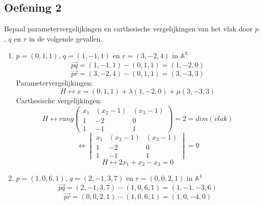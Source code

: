 \documentclass[main.tex]{subfiles}
\begin{document}
\subsection*{Oefening 2}
Bepaal parametervergelijkingen en carthesische vergelijkingen van het vlak door $p$, $q$ en $r$ in de volgende gevallen.
\begin{enumerate}
\item $p=(0,1,1)$, $q=(1,-1,1)$ en $r=(3,-2,4)$ in $\mathbb{A}^{3}$\\
  \[ \overrightarrow{pq} = (1,-1,1) - (0,1,1) = (1,-2,0) \]
  \[ \overrightarrow{pr} = (3,-2,4) - (0,1,1) = (3,-3,3) \]
  Parametervergelijkingen:
  \[ H \leftrightarrow x = (0,1,1) + \lambda (1,-2,0) + \mu (3,-3,3) \]
  Carthesische vergelijkingen:
  \[
  H \leftrightarrow 
  rang 
  \begin{pmatrix}
    x_{1} & (x_{2}-1) & (x_{3}-1)\\
    1 & -2 & 0\\
    1&-1&1
  \end{pmatrix}
  = 2 = dim(vlak)
  \]
  \[
  \Leftrightarrow 
  \begin{vmatrix}
    x_{1} & (x_{2}-1) & (x_{3}-1)\\
    1 & -2 & 0\\
    1&-1&1
  \end{vmatrix}
  = 0
  \]
  \[ H \leftrightarrow 2x_{1}+ x_{2}-x_{3} = 0 \]
\item $p= (1,0,6,1)$, $q=(2,-1,3,7)$ en $r=(0,0,2,1)$ in $\mathbb{A}^{4}$\\
  \[ \overrightarrow{pq} = (2,-1,3,7) - (1,0,6,1) = (1,-1,-3,6) \]
  \[ \overrightarrow{pr} = (0,0,2,1) - (1,0,6,1) = (1,0,-4,0) \]
  
\end{enumerate}
\end{document}

